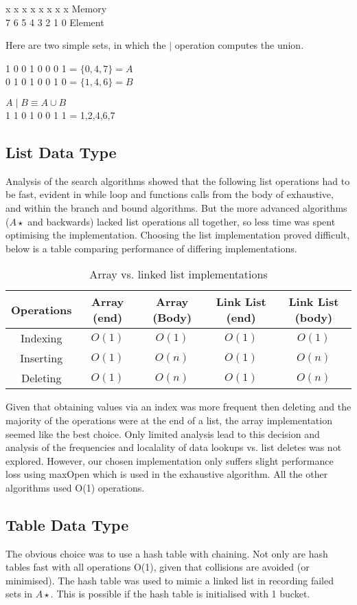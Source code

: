 x x x x x x x x  Memory
\\
7 6 5 4 3 2 1 0  Element

Here are two simple sets, in which the $\mid$ operation computes the union.

1 0 0 1 0 0 0 1 = $\{0,4,7\} = A$
\\ 
0 1 0 1 0 0 1 0 = $\{1,4,6\} = B$

$A \mid B \equiv A \cup B$
\\
1 1 0 1 0 0 1 1 = {1,2,4,6,7}


\subsection{List Data Type} Analysis of the search algorithms showed that the
following list operations had to be fast, evident in while loop and functions
calls from the body of exhaustive, and within the branch and bound algorithms.
But the more advanced algorithms ($A\star$ and backwards) lacked list
operations all together, so less time was spent optimising the implementation.
Choosing the list implementation proved difficult, below is a table comparing
performance of differing implementations.

\begin{table}[H]
\begin{tabular}{|c|c|c|c|c|}\hline
Operations & Array (end) & Array (Body) & Link List (end) & Link List (body) \\
\hline
Indexing&$O(1)$&$O(1)$&$O(1)$&$O(1)$\\
Inserting&$O(1)$&$O(n)$&$O(1)$&$O(n)$\\
Deleting&$O(1)$&$O(n)$&$O(1)$&$O(n)$\\
\hline
\end{tabular}
\caption{Array vs. linked list implementations}
\end{table}

Given that obtaining values via an index was more frequent then deleting and
the majority of the operations were at the end of a list, the array
implementation seemed like the best choice. Only limited analysis lead to this
decision and analysis of the frequencies and localality of data lookups vs.
list deletes was not explored. However, our chosen implementation only suffers
slight performance loss using maxOpen which is used in the exhaustive
algorithm. All the other algorithms used O(1) operations.

\subsection{Table Data Type}
The obvious choice was to use a hash table with chaining. Not only are hash
tables fast with all operations O(1), given that collisions are avoided (or
minimised). The hash table was used to mimic a linked list in recording failed
sets in $A\star$. This is possible if the hash table is initialised with 1
bucket.

